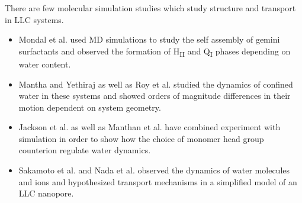   There are few molecular simulation studies which study structure and transport
  in LLC systems.
  \begin{itemize}
    \item Mondal et al. used MD simulations to study the self assembly of gemini 
    surfactants and observed the formation of H\textsubscript{II} and Q\textsubscript{I}
    phases depending on water content.\cite{mondal_self-assembly_2013}
    \item Mantha and Yethiraj as well as Roy et al. studied the dynamics of confined 
    water in these systems and showed orders of magnitude differences in their motion
    dependent on system geometry.~\cite{mantha_dynamics_2016,roy_water_2016}
    \item Jackson et al. as well as Manthan et al. have combined experiment with simulation
    in order to show how the choice of monomer head group counterion regulate water 
    dynamics.~\cite{jackson_ion-specific_2018,mantha_counterion-regulated_2018}
    \item Sakamoto et al. and Nada et al. observed the dynamics of water molecules
    and ions and hypothesized transport mechanisms in a simplified model of an LLC
    nanopore.~\cite{sakamoto_development_2018,nada_transport_2020}
  \end{itemize}

